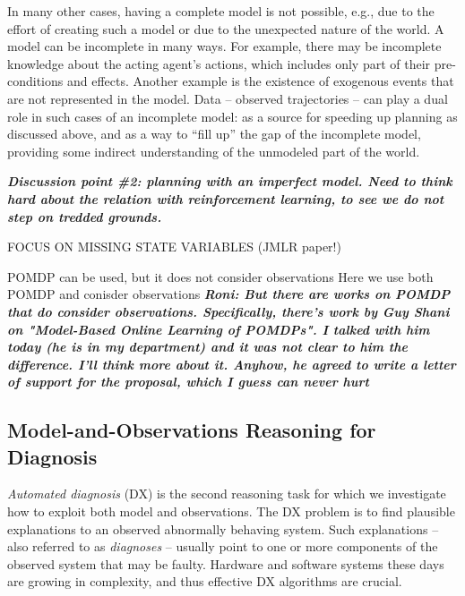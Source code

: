 \documentclass[12pt]{article}
\newcommand{\note}[1]{\textbf{\textit{#1}}}
\begin{document}
In many other cases, having a complete model is not possible, e.g., due to the effort of creating such a model or due to the unexpected nature of the world. 
A model can be incomplete in many ways. For example, there may be incomplete knowledge about the acting agent's actions, which includes only part of their pre-conditions and effects. Another example is the existence of exogenous events that are not represented in the model. Data -- observed trajectories -- can play a dual role in such cases of an incomplete model: as a source for speeding up planning as discussed above, and as a way to ``fill up'' the gap of the incomplete model, providing some indirect understanding of the unmodeled part of the world. 


\note{Discussion point \#2: planning with an imperfect model. Need to think hard about the relation with reinforcement learning, to see we do not step on tredded grounds.}

FOCUS ON MISSING STATE VARIABLES (JMLR paper!)


POMDP can be used, but it does not consider observations
Here we use both POMDP and conisder observations
\note{Roni: But there are works on POMDP that do consider observations. Specifically, there's work by Guy Shani on "Model-Based Online Learning of POMDPs". I talked with him today (he is in my department) and it was not clear to him the difference. I'll think more about it. Anyhow, he agreed to write a letter of support for the proposal, which I guess can never hurt}








\subsection{Model-and-Observations Reasoning for Diagnosis}
{\em Automated diagnosis} (DX) is the second reasoning task for which we investigate how to exploit both model and observations. The DX problem is to find plausible explanations to an observed abnormally behaving system. Such explanations -- also referred to as {\em diagnoses} -- usually point to one or more components of the observed system that may be faulty. 
Hardware and software systems these days are growing in complexity, and thus effective DX algorithms are crucial. 
\end{document}
